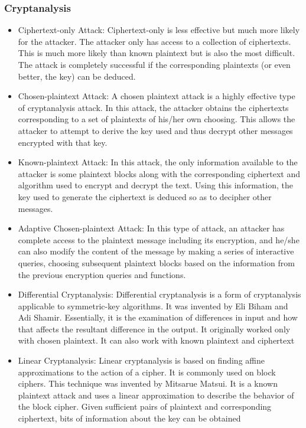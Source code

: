 \subsubsection{Cryptanalysis}
\begin{itemize}
    \item Ciphertext-only Attack: Ciphertext-only is less effective but much more likely for the attacker. The attacker only has access to a collection of ciphertexts. This is much more likely than known plaintext but is also the most difficult. The attack is completely successful if the corresponding plaintexts (or even better, the key) can be deduced.
    \item Chosen-plaintext Attack: A chosen plaintext attack is a highly effective type of cryptanalysis attack. In this attack, the attacker obtains the ciphertexts corresponding to a set of plaintexts of his/her own choosing. This allows the attacker to attempt to derive the key used and thus decrypt other messages encrypted with that key.
    \item Known-plaintext Attack: In this attack, the only information available to the attacker is some plaintext blocks along with the corresponding ciphertext and algorithm used to encrypt and decrypt the text. Using this information, the key used to generate the ciphertext is deduced so as to decipher other messages.
    \item Adaptive Chosen-plaintext Attack: In this type of attack, an attacker has complete access to the plaintext message including its encryption, and he/she can also modify the content of the message by making a series of interactive queries, choosing subsequent plaintext blocks based on the information from the previous encryption queries and functions.
    \item Differential Cryptanalysis: Differential cryptanalysis is a form of cryptanalysis applicable to symmetric-key algorithms. It was invented by Eli Biham and Adi Shamir. Essentially, it is the examination of differences in input and how that affects the resultant difference in the output. It originally worked only with chosen plaintext. It can also work with known plaintext and ciphertext
    \item Linear Cryptanalysis: Linear cryptanalysis is based on finding affine approximations to the action of a cipher. It is commonly used on block ciphers. This technique was invented by Mitsarue Matsui. It is a known plaintext attack and uses a linear approximation to describe the behavior of the block cipher. Given sufficient pairs of plaintext and corresponding ciphertext, bits of information about the key can be obtained

\end{itemize}
